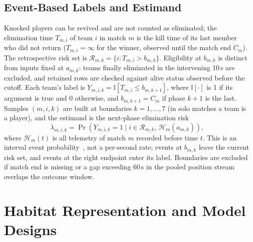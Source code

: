 \documentclass[sigconf,anonymous,nonacm]{acmart}
\begin{document}
\subsection{Event-Based Labels and Estimand}
Knocked players can be revived and are not counted as eliminated; the elimination time $T_{m,i}$ of team $i$ in match $m$ is the kill time of its last member who did not return ($T_{m,i}=\infty$ for the winner, observed until the match end $C_m$).
The retrospective risk set is $\mathcal{R}_{m,k}=\{i:T_{m,i}>b_{m,k}\}$. Eligibility at $b_{m,k}$ is distinct from inputs fixed at $a_{m,k}$: teams finally eliminated in the intervening 10\,s are excluded, and retained rows are checked against alive status observed before the cutoff.
Each team's label is $Y_{m,i,k}=\mathbb{I}[T_{m,i}\le b_{m,k+1}]$, where $\mathbb{I}[\cdot]$ is 1 if its argument is true and 0 otherwise, and $b_{m,k+1}=C_m$ if phase $k+1$ is the last.
Samples $(m,i,k)$ are built at boundaries $k=1,\dots,7$ (in solo matches a team is a player), and the estimand is the next-phase elimination risk
\begin{equation}
\lambda_{m,i,k}=\Pr\!\left(Y_{m,i,k}=1 \mid i\in\mathcal{R}_{m,k},\,\mathcal{H}_{m}(a_{m,k})\right),
\label{eq:hazard}
\end{equation}
where $\mathcal{H}_{m}(t)$ is all telemetry of match $m$ recorded before time $t$.
This is an interval event probability~\cite{vanHouwelingen07}, not a per-second rate; events at $b_{m,k}$ leave the current risk set, and events at the right endpoint enter its label. Boundaries are excluded if match end is missing or a gap exceeding 60\,s in the pooled position stream overlaps the outcome window.

\section{Habitat Representation and Model Designs}
\label{sec:method:design}
\end{document}
